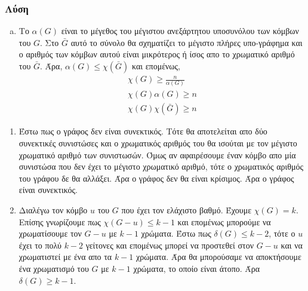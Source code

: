 \documentclass{assignment}
\begin{document}
\subsubsection*{Λύση}

\begin{enumerate}[(a)]

\item

Το $\alpha(G)$ είναι το μέγεθος του μέγιστου ανεξάρτητου υποσυνόλου των κόμβων του $G$. Στο $\bar G$ αυτό το σύνολο θα σχηματίζει το μέγιστο
πλήρες υπο-γράφημα και ο αριθμός των κόμβων αυτού είναι μικρότερος ή ίσος απο το χρωματικό αριθμό του $\bar G$.
Άρα, $\alpha(G) \le \chi(\bar G)$ και επομένως,
\begin{gather*}
\chi(G) \ge \frac{n}{\alpha(G)} \\
\chi(G) \alpha(G) \ge n \\
\chi(G) \chi(\bar G) \ge n
\end{gather*}

\end{enumerate}

\begin{enumerate}[({b}.i)]
\item 
Έστω πως ο γράφος δεν είναι συνεκτικός. Τότε θα αποτελείται απο δύο συνεκτικές συνιστώσες και ο χρωματικός αριθμός του θα ισούται 
με τον μέγιστο χρωματικό αριθμό των συνιστωσών. Όμως αν αφαιρέσουμε έναν κόμβο απο μία συνιστώσα που δεν έχει το μέγιστο
χρωματικό αριθμό, τότε ο χρωματικός αριθμός του γράφου δε θα αλλάξει. Άρα ο γράφος δεν θα είναι κρίσιμος. Άρα ο γράφος είναι συνεκτικός.

\item
Διαλέγω τον κόμβο $u$ του $G$ που έχει τον ελάχιστο βαθμό. Έχουμε $\chi(G) = k$. Επίσης γνωρίζουμε πως 
$\chi(G-u) \le k-1$ και επομένως μπορούμε να χρωματίσουμε τον $G-u$ με $k-1$ χρώματα. 
Έστω πως $\delta(G) \le k-2$, τότε ο $u$ έχει το πολύ $k-2$ γείτονες και επομένως μπορεί να προστεθεί 
στον $G-u$ και να χρωματιστεί με ένα απο τα $k-1$ χρώματα. Άρα θα μπορούσαμε να αποκτήσουμε ένα χρωματισμό του $G$ με $k-1$ 
χρώματα, το οποίο είναι άτοπο. Άρα $\delta(G) \ge k-1$.

\end{enumerate}
\end{document}
